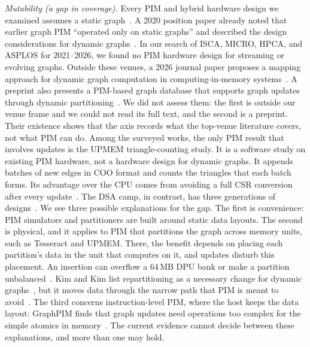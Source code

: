 \documentclass[journal,onecolumn]{IEEEtran}
\begin{document}
\emph{Mutability (a gap in coverage).} Every PIM and hybrid hardware design we examined assumes a static graph~\cite{ahn2015tesseract,zhang2018graphp,zhuo2019graphq,song2018graphr,ahn2015pei,nai2017graphpim,shin2025piccolo,shin2025fala,yenimol2026cograf}. A 2020 position paper already noted that earlier graph PIM ``operated only on static graphs'' and described the design considerations for dynamic graphs~\cite{kim2020dynamic}. In our search of ISCA, MICRO, HPCA, and ASPLOS for 2021--2026, we found no PIM hardware design for streaming or evolving graphs. Outside these venues, a 2026 journal paper proposes a mapping approach for dynamic graph computation in computing-in-memory systems~\cite{ghasemi2026dynamic}. A preprint also presents a PIM-based graph database that supports graph updates through dynamic partitioning~\cite{ma2024moctopus}. We did not assess them: the first is outside our venue frame and we could not read its full text, and the second is a preprint. Their existence shows that the axis records what the top-venue literature covers, not what PIM can do. Among the surveyed works, the only PIM result that involves updates is the UPMEM triangle-counting study. It is a software study on existing PIM hardware, not a hardware design for dynamic graphs. It appends batches of new edges in COO format and counts the triangles that each batch forms. Its advantage over the CPU comes from avoiding a full CSR conversion after every update~\cite{asquini2025tc}. The DSA camp, in contrast, has three generations of designs~\cite{rahman2021jetstream,zhao2022tdgraph,gao2023mega}. We see three possible explanations for the gap. The first is convenience: PIM simulators and partitioners are built around static data layouts. The second is physical, and it applies to PIM that partitions the graph across memory units, such as Tesseract and UPMEM. There, the benefit depends on placing each partition's data in the unit that computes on it, and updates disturb this placement. An insertion can overflow a 64\,MB DPU bank or make a partition unbalanced~\cite{cai2024pimpam}. Kim and Kim list repartitioning as a necessary change for dynamic graphs~\cite{kim2020dynamic}, but it moves data through the narrow path that PIM is meant to avoid~\cite{gomezluna2022prim}. The third concerns instruction-level PIM, where the host keeps the data layout: GraphPIM finds that graph updates need operations too complex for the simple atomics in memory~\cite{nai2017graphpim}. The current evidence cannot decide between these explanations, and more than one may hold.
\end{document}

